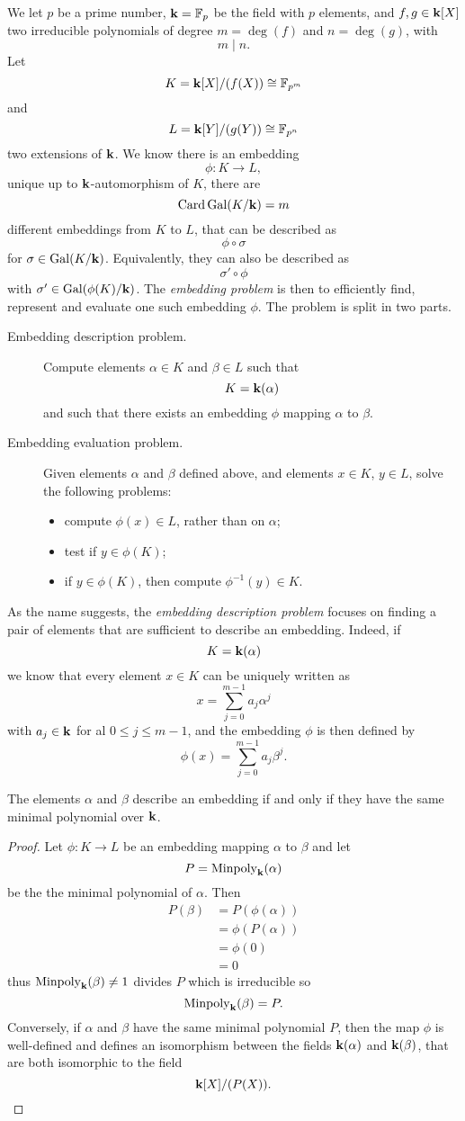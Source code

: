 We let $p$ be a prime number, $\mathbf{k} = \mathbb{F}_p$ be the field with $p$ elements,
and $f, g\in\mathbf{k}[X]$ two irreducible polynomials of degree $m=\deg(f)$ and
$n=\deg(g)$, with
\[
  m\mid n.
\]
Let
\[
  K=\mathbf{k}[X]/(f(X))\cong\mathbb{F}_{p^m}
\]
and
\[
  L = \mathbf{k}[Y]/(g(Y))\cong\mathbb{F}_{p^n}
\]
two extensions of $\mathbf{k}$. We know there is an embedding
\[
  \phi:K\to L,
\]
unique up to $\mathbf{k}$-automorphism of $K$, \ie there are
\[
  \operatorname{Card}\operatorname{Gal}(K/\mathbf{k})=m
\]
different embeddings from $K$ to $L$, that can be described as
\[
  \phi\circ\sigma
\]
for $\sigma\in\operatorname{Gal}(K/\mathbf{k})$. Equivalently, they can also be described as
\[
  \sigma'\circ\phi
\]
with $\sigma'\in\operatorname{Gal}(\phi(K)/\mathbf{k})$. The \emph{embedding problem} is then to
efficiently find, represent and evaluate one such embedding $\phi$. The problem
is split in two parts.
\begin{description}
  \item[Embedding description problem.] Compute elements $\alpha\in K$ and
    $\beta\in L$ such that 
    \[
      K=\mathbf{k}(\alpha)
    \]
    and such that there exists an embedding $\phi$ mapping $\alpha$ to $\beta$.
  \item[Embedding evaluation problem.] Given elements $\alpha$ and $\beta$
    defined above, and elements $x\in K$, $y\in L$, solve the
    following problems:
    \begin{itemize}
      \item compute $\phi(x)\in L$, rather than on $\alpha$;
      \item test if $y\in\phi(K)$;
      \item if $y\in\phi(K)$, then compute $\phi^{-1}(y)\in K$.
    \end{itemize}
\end{description}
As the name suggests, the \emph{embedding description problem} focuses on
finding a pair of elements that are sufficient to describe an embedding. Indeed,
if 
\[
  K=\mathbf{k}(\alpha)
\]
we know that every element $x\in K$ can be uniquely written as 
\[
  x = \sum_{j=0}^{m-1}a_j\alpha^j
\]
with $a_j\in\mathbf{k}$ for al $0\leq j\leq m-1$, and the embedding $\phi$ is then
defined by
\[
  \phi(x) = \sum_{j=0}^{m-1}a_j\beta^j.
\]
\begin{prop}
  \label{prop:description}
 The elements $\alpha$ and $\beta$
 describe an embedding if and only if they have the same minimal polynomial over
 $\mathbf{k}$. 
\end{prop}
\begin{proof}
  Let $\phi:K\to L$ be an embedding mapping $\alpha$ to $\beta$ and let 
  \[
    P = \operatorname{Minpoly}_{\mathbf{k}}(\alpha)
  \]
  be the the minimal polynomial of $\alpha$. Then 
  \begin{align*}
    P(\beta) &= P(\phi(\alpha)) \\
    &= \phi(P(\alpha))\\
    &= \phi(0) \\
    &= 0
  \end{align*}
  thus $\operatorname{Minpoly}_{\mathbf{k}}(\beta)\neq 1$ divides $P$ which is irreducible so 
  \[
\operatorname{Minpoly}_{\mathbf{k}}(\beta) = P.
  \]
 Conversely, if $\alpha$ and $\beta$ have the same minimal polynomial $P$, then the
 map $\phi$ is well-defined and defines an isomorphism between the fields $\mathbf{k}(\alpha)$ and
 $\mathbf{k}(\beta)$, that are both isomorphic to the field
 \[
   \mathbf{k}[X]/(P(X)).
 \]
\end{proof}
